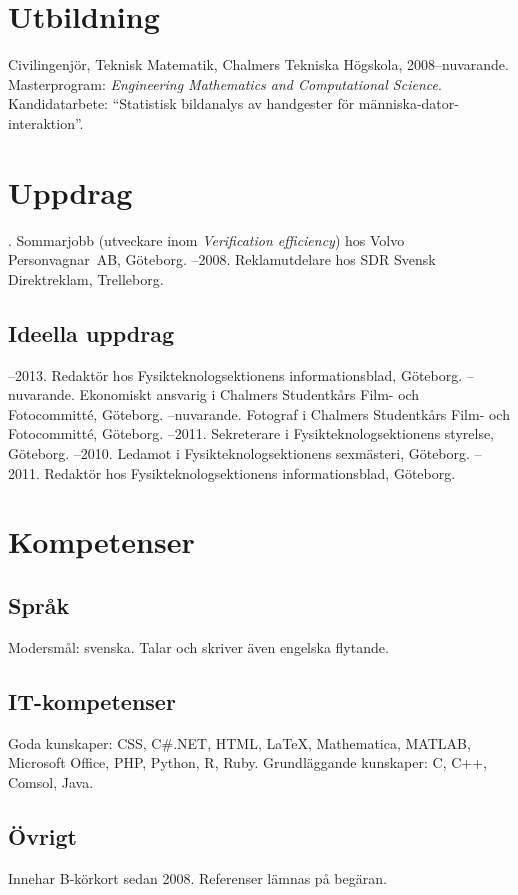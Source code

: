 \documentclass{skvitae}
\author{Simon Sigurdhsson}
\affiliation{}
\begin{document}
	\maketitle

	\section{Utbildning}
	\ind Civilingenjör, Teknisk Matematik, Chalmers Tekniska Högskola, 2008--nuvarande.\\Masterprogram: \emph{Engineering Mathematics and Computational Science}.\\Kandidatarbete: \enquote{Statistisk bildanalys av handgester för människa-dator-interaktion}.

	\section{Uppdrag}
	. Sommarjobb (utveckare inom \emph{Verification efficiency}) hos Volvo Person\-vagnar~AB, Göteborg.
	--2008. Reklamutdelare hos SDR Svensk Direktreklam, Trelleborg.

	\medskip
	\subsection{Ideella uppdrag}
	--2013. Redaktör hos Fysikteknologsektionens informationsblad, Göteborg.
	--nuvarande. Ekonomiskt ansvarig i Chalmers Studentkårs Film- och Fotocommitté, Göteborg.
	--nuvarande. Fotograf i Chalmers Studentkårs Film- och Fotocommitté, Göteborg.
	--2011. Sekreterare i Fysikteknologsektionens styrelse, Göteborg.
	--2010. Ledamot i Fysikteknologsektionens sexmästeri, Göteborg.
	--2011. Redaktör hos Fysikteknologsektionens informationsblad, Göteborg.

	\section{Kompetenser}
	\subsection{Språk}
	\ind Modersmål: svenska. Talar och skriver även engelska flytande.

	\medskip
	\subsection{IT-kompetenser}
	\ind Goda kunskaper: CSS, C\#.NET, HTML, \LaTeX, Mathematica, MATLAB, Microsoft Office, PHP, Python, R, Ruby.
	\ind Grundläggande kunskaper: C, C++, Comsol, Java.

	\medskip
	\subsection{Övrigt}
	\ind Innehar B-körkort sedan 2008.
	\ind Referenser lämnas på begäran.
\end{document}
